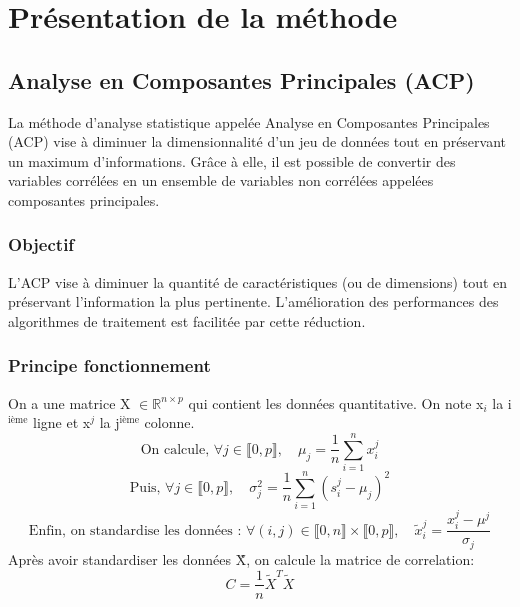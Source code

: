\documentclass[a4paper,12pt]{article}
\begin{document}
\newpage

\section{Présentation de la méthode}
\label{sec:presentation2}
\subsection{Analyse en Composantes Principales (ACP)}

La méthode d'analyse statistique appelée Analyse en Composantes Principales (ACP) vise à diminuer la dimensionnalité d'un jeu de données tout en préservant un maximum d'informations. Grâce à elle, il est possible de convertir des variables corrélées en un ensemble de variables non corrélées appelées composantes principales.\\

\subsubsection{Objectif}

L'ACP vise à diminuer la quantité de caractéristiques (ou de dimensions) tout en préservant l'information la plus pertinente. L'amélioration des performances des algorithmes de traitement est facilitée par cette réduction. \\

\subsubsection{Principe fonctionnement}

On a une matrice X $ \in \mathbb{R}^{n\times p}$ qui contient les données quantitative. On note x$_i$ la i$^{\text{ième}}$ ligne et x$^j$ la j$^{\text{ième}}$ colonne.\\

\begin{equation}
  \text{On calcule, } \forall j \in \llbracket 0, p \rrbracket, \quad \mu_j = \frac{1}{n} \sum_{i=1}^nx_i^j
\end{equation}
\begin{equation}
  \text{Puis, } \forall j \in \llbracket 0, p \rrbracket, \quad \sigma_j^2 = \frac{1}{n} \sum_{i =1}^n (s_i^j - \mu_j )^2
\end{equation}
\begin{equation}
  \text{Enfin, on standardise les données : } \forall (i, j) \in \llbracket 0, n \rrbracket \times \llbracket 0, p \rrbracket, \quad \tilde{x}_i^j = \frac{ x_i^j - \mu^j}{\sigma_j}
\end{equation}
\vspace{10pt}
Après avoir standardiser les données \~X, on calcule la matrice de correlation:
\begin{equation}
  C = \frac{1}{n}\tilde{X}^T\tilde{X}
\end{equation}
\end{document}
